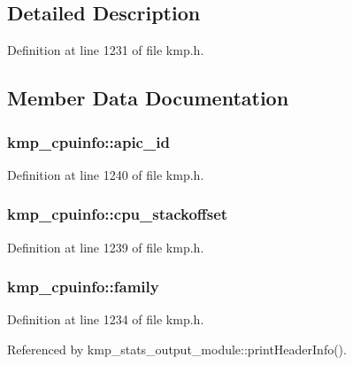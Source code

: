 \subsection{Detailed Description}


Definition at line 1231 of file kmp.\-h.



\subsection{Member Data Documentation}
\hypertarget{structkmp__cpuinfo_a0aca284c6e9b610e35c33c2ead7b6ce8}{
\subsubsection[{apic\-\_\-id}]{ kmp\-\_\-cpuinfo\-::apic\-\_\-id}}\label{structkmp__cpuinfo_a0aca284c6e9b610e35c33c2ead7b6ce8}


Definition at line 1240 of file kmp.\-h.

\hypertarget{structkmp__cpuinfo_a261ccb280417486b1f9972e6c2d5d717}{
\subsubsection[{cpu\-\_\-stackoffset}]{ kmp\-\_\-cpuinfo\-::cpu\-\_\-stackoffset}}\label{structkmp__cpuinfo_a261ccb280417486b1f9972e6c2d5d717}


Definition at line 1239 of file kmp.\-h.

\hypertarget{structkmp__cpuinfo_a0ef7a4d4fcf0f147c6049310bed9d966}{
\subsubsection[{family}]{ kmp\-\_\-cpuinfo\-::family}}\label{structkmp__cpuinfo_a0ef7a4d4fcf0f147c6049310bed9d966}


Definition at line 1234 of file kmp.\-h.



Referenced by kmp\-\_\-stats\-\_\-output\-\_\-module\-::print\-Header\-Info().

